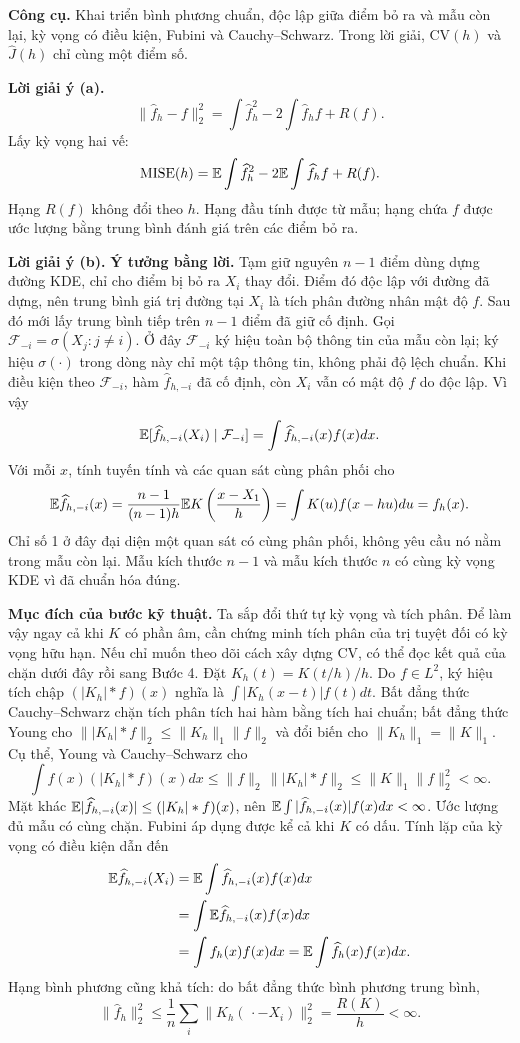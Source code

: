 \textbf{Công cụ.} Khai triển bình phương chuẩn, độc lập giữa điểm bỏ ra và mẫu còn lại,
kỳ vọng có điều kiện, Fubini và Cauchy--Schwarz.
Trong lời giải, $\mathrm{CV}(h)$ và $\widehat J(h)$ chỉ cùng một điểm số.

\textbf{Lời giải ý (a).}
\[
\|\widehat f_h-f\|_2^2
=\int\widehat f_h^2-2\int\widehat f_h f+R(f).
\]
Lấy kỳ vọng hai vế:
\[
\operatorname{MISE}(h)=\mathbb E\int\widehat f_h^2-2\mathbb E\int\widehat f_h f+R(f).
\]
Hạng $R(f)$ không đổi theo $h$. Hạng đầu tính được từ mẫu;
hạng chứa $f$ được ước lượng bằng trung bình đánh giá trên các điểm bỏ ra.

\textbf{Lời giải ý (b).}
\textbf{Ý tưởng bằng lời.} Tạm giữ nguyên $n-1$ điểm dùng dựng đường KDE,
chỉ cho điểm bị bỏ ra $X_i$ thay đổi. Điểm đó độc lập với đường đã dựng,
nên trung bình giá trị đường tại $X_i$ là tích phân đường nhân mật độ $f$.
Sau đó mới lấy trung bình tiếp trên $n-1$ điểm đã giữ cố định.
Gọi $\mathcal F_{-i}=\sigma(X_j:j\ne i)$.
Ở đây $\mathcal F_{-i}$ ký hiệu toàn bộ thông tin của mẫu còn lại;
ký hiệu $\sigma(\cdot)$ trong dòng này chỉ một tập thông tin, không phải độ lệch chuẩn.
Khi điều kiện theo $\mathcal F_{-i}$, hàm $\widehat f_{h,-i}$ đã cố định,
còn $X_i$ vẫn có mật độ $f$ do độc lập. Vì vậy
\[
\mathbb E[\widehat f_{h,-i}(X_i)\mid\mathcal F_{-i}]
=\int\widehat f_{h,-i}(x)f(x)dx.
\]
Với mỗi $x$, tính tuyến tính và các quan sát cùng phân phối cho
\[
\mathbb E\widehat f_{h,-i}(x)
=\frac{n-1}{(n-1)h}\mathbb E K\left(\frac{x-X_1}{h}\right)
=\int K(u)f(x-hu)du=f_h(x).
\]
Chỉ số 1 ở đây đại diện một quan sát có cùng phân phối, không yêu cầu nó nằm trong mẫu còn lại.
Mẫu kích thước $n-1$ và mẫu kích thước $n$ có cùng kỳ vọng KDE vì đã chuẩn hóa đúng.

\textbf{Mục đích của bước kỹ thuật.} Ta sắp đổi thứ tự kỳ vọng và tích phân.
Để làm vậy ngay cả khi $K$ có phần âm, cần chứng minh tích phân của trị tuyệt đối
có kỳ vọng hữu hạn. Nếu chỉ muốn theo dõi cách xây dựng CV,
có thể đọc kết quả của chặn dưới đây rồi sang Bước 4.
Đặt $K_h(t)=K(t/h)/h$. Do $f\in L^2$,
ký hiệu tích chập $(|K_h|*f)(x)$ nghĩa là
$\int |K_h(x-t)|f(t)dt$.
Bất đẳng thức Cauchy--Schwarz chặn tích phân tích hai hàm bằng tích hai chuẩn;
bất đẳng thức Young cho $\||K_h|*f\|_2\leq\|K_h\|_1\|f\|_2$
và đổi biến cho $\|K_h\|_1=\|K\|_1$. Cụ thể,
Young và Cauchy--Schwarz cho
\[
\int f(x)(|K_h|*f)(x)dx
\leq\|f\|_2\,\||K_h|*f\|_2
\leq\|K\|_1\|f\|_2^2<\infty.
\]
Mặt khác $\mathbb E|\widehat f_{h,-i}(x)|\leq(|K_h|*f)(x)$,
nên $\mathbb E\int|\widehat f_{h,-i}(x)|f(x)dx<\infty$.
Ước lượng đủ mẫu có cùng chặn. Fubini áp dụng được kể cả khi $K$ có dấu.
Tính lặp của kỳ vọng có điều kiện dẫn đến
\begin{align*}
\mathbb E\widehat f_{h,-i}(X_i)
&=\mathbb E\int\widehat f_{h,-i}(x)f(x)dx\\
&=\int\mathbb E\widehat f_{h,-i}(x)f(x)dx\\
&=\int f_h(x)f(x)dx
=\mathbb E\int\widehat f_h(x)f(x)dx.
\end{align*}
Hạng bình phương cũng khả tích: do bất đẳng thức bình phương trung bình,
\[
\|\widehat f_h\|_2^2
\leq\frac1n\sum_i\|K_h(\,\cdot-X_i)\|_2^2=\frac{R(K)}h<\infty.
\]

